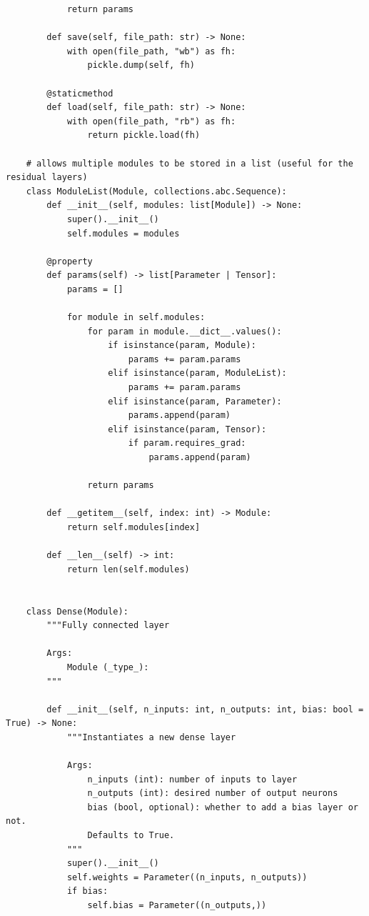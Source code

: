 \documentclass{article}
\begin{document}
\begin{verbatim}
            return params

        def save(self, file_path: str) -> None:
            with open(file_path, "wb") as fh:
                pickle.dump(self, fh)

        @staticmethod
        def load(self, file_path: str) -> None:
            with open(file_path, "rb") as fh:
                return pickle.load(fh)

    # allows multiple modules to be stored in a list (useful for the residual layers)
    class ModuleList(Module, collections.abc.Sequence):
        def __init__(self, modules: list[Module]) -> None:
            super().__init__()
            self.modules = modules

        @property
        def params(self) -> list[Parameter | Tensor]:
            params = []

            for module in self.modules:
                for param in module.__dict__.values():
                    if isinstance(param, Module):
                        params += param.params
                    elif isinstance(param, ModuleList):
                        params += param.params
                    elif isinstance(param, Parameter):
                        params.append(param)
                    elif isinstance(param, Tensor):
                        if param.requires_grad:
                            params.append(param)

                return params

        def __getitem__(self, index: int) -> Module:
            return self.modules[index]

        def __len__(self) -> int:
            return len(self.modules)


    class Dense(Module):
        """Fully connected layer

        Args:
            Module (_type_):
        """

        def __init__(self, n_inputs: int, n_outputs: int, bias: bool = True) -> None:
            """Instantiates a new dense layer

            Args:
                n_inputs (int): number of inputs to layer
                n_outputs (int): desired number of output neurons
                bias (bool, optional): whether to add a bias layer or not. 
                Defaults to True.
            """
            super().__init__()
            self.weights = Parameter((n_inputs, n_outputs))
            if bias:
                self.bias = Parameter((n_outputs,))


\end{verbatim}
\end{document}
